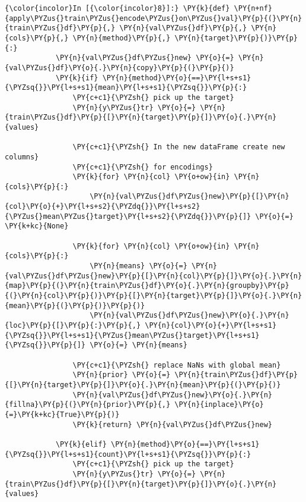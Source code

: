     \begin{Verbatim}[commandchars=\\\{\}]
{\color{incolor}In [{\color{incolor}8}]:} \PY{k}{def} \PY{n+nf}{apply\PYZus{}train\PYZus{}encode\PYZus{}on\PYZus{}val}\PY{p}{(}\PY{n}{train\PYZus{}df}\PY{p}{,} \PY{n}{val\PYZus{}df}\PY{p}{,} \PY{n}{cols}\PY{p}{,} \PY{n}{method}\PY{p}{,} \PY{n}{target}\PY{p}{)}\PY{p}{:}
            \PY{n}{val\PYZus{}df\PYZus{}new} \PY{o}{=} \PY{n}{val\PYZus{}df}\PY{o}{.}\PY{n}{copy}\PY{p}{(}\PY{p}{)}
            \PY{k}{if} \PY{n}{method}\PY{o}{==}\PY{l+s+s1}{\PYZsq{}}\PY{l+s+s1}{mean}\PY{l+s+s1}{\PYZsq{}}\PY{p}{:}
                \PY{c+c1}{\PYZsh{} pick up the target}
                \PY{n}{y\PYZus{}tr} \PY{o}{=} \PY{n}{train\PYZus{}df}\PY{p}{[}\PY{n}{target}\PY{p}{]}\PY{o}{.}\PY{n}{values}
        
                \PY{c+c1}{\PYZsh{} In the new dataFrame create new columns}
                \PY{c+c1}{\PYZsh{} for encodings}
                \PY{k}{for} \PY{n}{col} \PY{o+ow}{in} \PY{n}{cols}\PY{p}{:}
                    \PY{n}{val\PYZus{}df\PYZus{}new}\PY{p}{[}\PY{n}{col}\PY{o}{+}\PY{l+s+s2}{\PYZdq{}}\PY{l+s+s2}{\PYZus{}mean\PYZus{}target}\PY{l+s+s2}{\PYZdq{}}\PY{p}{]} \PY{o}{=} \PY{k+kc}{None}
        
                \PY{k}{for} \PY{n}{col} \PY{o+ow}{in} \PY{n}{cols}\PY{p}{:}
                    \PY{n}{means} \PY{o}{=} \PY{n}{val\PYZus{}df\PYZus{}new}\PY{p}{[}\PY{n}{col}\PY{p}{]}\PY{o}{.}\PY{n}{map}\PY{p}{(}\PY{n}{train\PYZus{}df}\PY{o}{.}\PY{n}{groupby}\PY{p}{(}\PY{n}{col}\PY{p}{)}\PY{p}{[}\PY{n}{target}\PY{p}{]}\PY{o}{.}\PY{n}{mean}\PY{p}{(}\PY{p}{)}\PY{p}{)}
                    \PY{n}{val\PYZus{}df\PYZus{}new}\PY{o}{.}\PY{n}{loc}\PY{p}{[}\PY{p}{:}\PY{p}{,} \PY{n}{col}\PY{o}{+}\PY{l+s+s1}{\PYZsq{}}\PY{l+s+s1}{\PYZus{}mean\PYZus{}target}\PY{l+s+s1}{\PYZsq{}}\PY{p}{]} \PY{o}{=} \PY{n}{means}
        
                \PY{c+c1}{\PYZsh{} replace NaNs with global mean}
                \PY{n}{prior} \PY{o}{=} \PY{n}{train\PYZus{}df}\PY{p}{[}\PY{n}{target}\PY{p}{]}\PY{o}{.}\PY{n}{mean}\PY{p}{(}\PY{p}{)}
                \PY{n}{val\PYZus{}df\PYZus{}new}\PY{o}{.}\PY{n}{fillna}\PY{p}{(}\PY{n}{prior}\PY{p}{,} \PY{n}{inplace}\PY{o}{=}\PY{k+kc}{True}\PY{p}{)}
                \PY{k}{return} \PY{n}{val\PYZus{}df\PYZus{}new}
            
            \PY{k}{elif} \PY{n}{method}\PY{o}{==}\PY{l+s+s1}{\PYZsq{}}\PY{l+s+s1}{count}\PY{l+s+s1}{\PYZsq{}}\PY{p}{:}
                \PY{c+c1}{\PYZsh{} pick up the target}
                \PY{n}{y\PYZus{}tr} \PY{o}{=} \PY{n}{train\PYZus{}df}\PY{p}{[}\PY{n}{target}\PY{p}{]}\PY{o}{.}\PY{n}{values}
        

\end{Verbatim}
